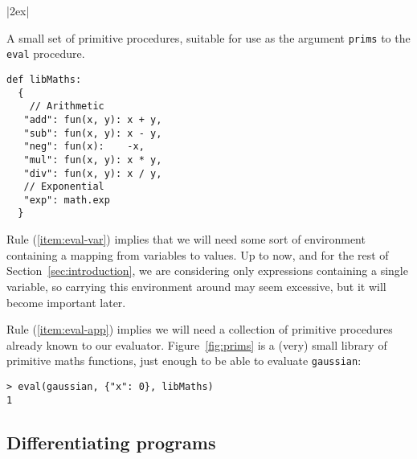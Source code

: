 \documentclass[11pt, a4paper]{article}
\newcommand{\cd}[1]{\texttt{#1}}
\begin{document}
\begin{marginfigure}|2ex|
  \caption{A small set of primitive procedures, suitable for use as
    the argument \cd{prims} to the \cd{eval} procedure.\label{fig:prims}}
\footnotesize
\begin{verbatim}
def libMaths:
  {
    // Arithmetic 
   "add": fun(x, y): x + y, 
   "sub": fun(x, y): x - y,
   "neg": fun(x):    -x,
   "mul": fun(x, y): x * y,
   "div": fun(x, y): x / y,
   // Exponential
   "exp": math.exp
  }
\end{verbatim}
\end{marginfigure}Rule (\ref{item:eval-var}) implies that we will need some sort of
environment containing a mapping from variables to values. Up to now,
and for the rest of Section~\ref{sec:introduction}, we are considering
only expressions containing a single variable, so carrying this
environment around may seem excessive, but it will become important
later.

Rule (\ref{item:eval-app}) implies we will need a collection of
primitive procedures already known to our
evaluator. Figure~\ref{fig:prims} is a (very) small library of
primitive maths functions, just enough to be able to evaluate
\cd{gaussian}:
\begin{verbatim}
> eval(gaussian, {"x": 0}, libMaths)
1
\end{verbatim}

\subsection{Differentiating programs}
\end{document}
